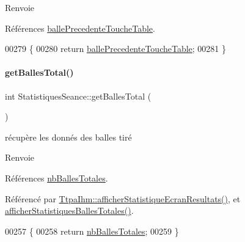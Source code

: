 \begin{DoxyReturn}{Renvoie}

\end{DoxyReturn}


Références \hyperlink{class_statistiques_seance_a36681be0a5a9fc48c4c332606a0418ad}{balle\+Precedente\+Touche\+Table}.


\begin{DoxyCode}
00279 \{
00280     \textcolor{keywordflow}{return} \hyperlink{class_statistiques_seance_a36681be0a5a9fc48c4c332606a0418ad}{ballePrecedenteToucheTable};
00281 \}
\end{DoxyCode}
\mbox{\label{class_statistiques_seance_aaefd0b775012ec914a36a262dc14fc66}} 
\paragraph{\texorpdfstring{get\+Balles\+Total()}{getBallesTotal()}}
{\footnotesize\ttfamily int Statistiques\+Seance\+::get\+Balles\+Total (\begin{DoxyParamCaption}{ }\end{DoxyParamCaption})}

récupère les donnés des balles tiré

\begin{DoxyReturn}{Renvoie}

\end{DoxyReturn}


Références \hyperlink{class_statistiques_seance_a27eb3965bbe304700d3254534c5e4ed3}{nb\+Balles\+Totales}.



Référencé par \hyperlink{class_ttpa_ihm_aa480a02532144d0f99af027b5b201ae1}{Ttpa\+Ihm\+::afficher\+Statistique\+Ecran\+Resultats()}, et \hyperlink{class_statistiques_seance_a216b30bcfca71e425073a7ac90e59089}{afficher\+Statistiques\+Balles\+Totales()}.


\begin{DoxyCode}
00257 \{
00258     \textcolor{keywordflow}{return} \hyperlink{class_statistiques_seance_a27eb3965bbe304700d3254534c5e4ed3}{nbBallesTotales};
00259 \}
\end{DoxyCode}
\mbox{\label{class_statistiques_seance_a1f956e08733a81d0a86673cae6bc7feb}} 
